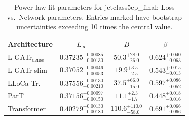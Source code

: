 \begin{table}[h]
  \centering
  \begin{tabular}{lccc}
    \toprule
    Architecture & $L_\infty$ & $B$ & $\beta$ \\
    \midrule
    L-GATr$_\mathrm{dense}$ & $0.37235^{+0.00085}_{-0.00130}$ & $50.3^{+28.0}_{-26.0}$ & $0.624^{+0.040}_{-0.063}$ \\
    L-GATr-slim & $0.37052^{+0.00046}_{-0.00053}$ & $19.9^{+3.5}_{-2.5}$ & $0.543^{+0.015}_{-0.013}$ \\
    LLoCa-Tr. & $0.37556^{+0.00130}_{-0.00210}$ & $37.5^{+66.0}_{-15.0}$ & $0.597^{+0.086}_{-0.052}$ \\
    ParT & $0.37156^{+0.00097}_{-0.00150}$ & $11.1^{+2.3}_{-1.7}$ & $0.448^{+0.018}_{-0.016}$ \\
    Transformer & $0.40279^{+0.00130}_{-0.00180}$ & $110.6^{+110.0}_{-58.0}$ & $0.691^{+0.066}_{-0.066}$ \\
    \bottomrule
  \end{tabular}
  \caption{Power-law fit parameters for jetclass5ep\_final: Loss vs.\ Network parameters. Entries marked \textemdash{} have bootstrap uncertainties exceeding 10 times the central value.}
  \label{tab:jetclass5ep_final}
\end{table}
